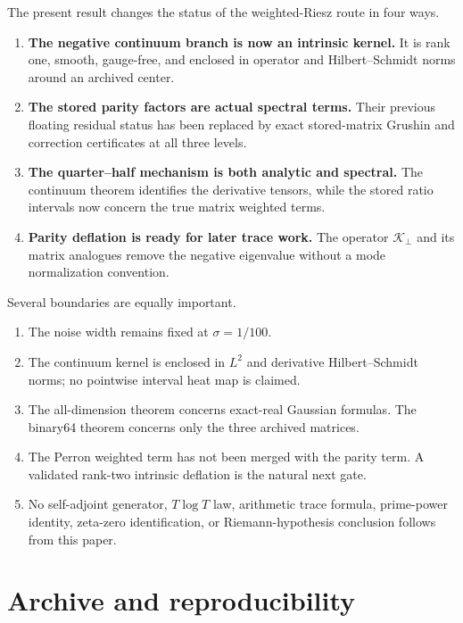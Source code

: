 \documentclass[11pt]{article}
\theoremstyle{definition}
\theoremstyle{remark}
\newcommand{\cK}{\mathcal K}
\begin{document}
The present result changes the status of the weighted-Riesz route in four
ways.
\begin{enumerate}[leftmargin=2em]
 \item \textbf{The negative continuum branch is now an intrinsic kernel.}
       It is rank one, smooth, gauge-free, and enclosed in operator and
       Hilbert--Schmidt norms around an archived center.
 \item \textbf{The stored parity factors are actual spectral terms.}
       Their previous floating residual status has been replaced by exact
       stored-matrix Grushin and correction certificates at all three
       levels.
 \item \textbf{The quarter--half mechanism is both analytic and spectral.}
       The continuum theorem identifies the derivative tensors, while the
       stored ratio intervals now concern the true matrix weighted terms.
 \item \textbf{Parity deflation is ready for later trace work.}
       The operator $\cK_\perp$ and its matrix analogues remove the negative
       eigenvalue without a mode normalization convention.
\end{enumerate}

Several boundaries are equally important.
\begin{enumerate}[leftmargin=2em]
 \item The noise width remains fixed at $\sigma=1/100$.
 \item The continuum kernel is enclosed in $L^2$ and derivative
       Hilbert--Schmidt norms; no pointwise interval heat map is claimed.
 \item The all-dimension theorem concerns exact-real Gaussian formulas.  The
       binary64 theorem concerns only the three archived matrices.
 \item The Perron weighted term has not been merged with the parity term.
       A validated rank-two intrinsic deflation is the natural next gate.
 \item No self-adjoint generator, $T\log T$ law, arithmetic trace formula,
       prime-power identity, zeta-zero identification, or Riemann-hypothesis
       conclusion follows from this paper.
\end{enumerate}

\section{Archive and reproducibility}
\label{sec:archive}
\end{document}
